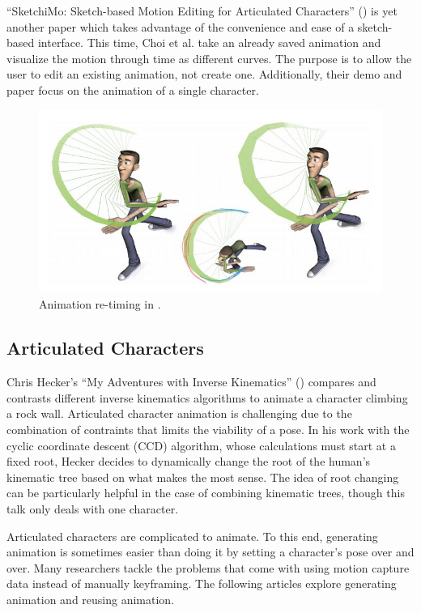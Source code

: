 ``SketchiMo: Sketch-based Motion Editing for Articulated Characters'' (\citep{choi2016sketchimo}) is yet another paper which takes advantage of the convenience and ease of a sketch-based interface. This time,  Choi et al. take an already saved animation and visualize the motion through time as different curves. The purpose is to allow the user to edit an existing animation, not create one. Additionally, their demo and paper focus on the animation of a single character.

\begin{figure}[!h]
\centering
\includegraphics[scale=0.5]{img/sketchimo}
\caption{Animation re-timing in \citep{choi2016sketchimo}.}
\end{figure}

\subsection{Articulated Characters}
Chris Hecker's ``My Adventures with Inverse Kinematics'' (\citep{hecker2002my}) compares and contrasts different inverse kinematics algorithms to animate a character climbing a rock wall. Articulated character animation is challenging due to the combination of contraints that limits the viability of a pose. In his work with the  cyclic coordinate descent (CCD) algorithm, whose calculations must start at a fixed root, Hecker decides to dynamically change the root of the human's kinematic tree based on what makes the most sense. The idea of root changing can be particularly helpful in the case of combining kinematic trees, though this talk only deals with one character.

Articulated characters are complicated to animate. To this end, generating animation is sometimes easier than doing it by setting a character's pose over and over. Many researchers tackle the problems that come with using motion capture data instead of manually keyframing. The following articles explore generating animation and reusing animation.


